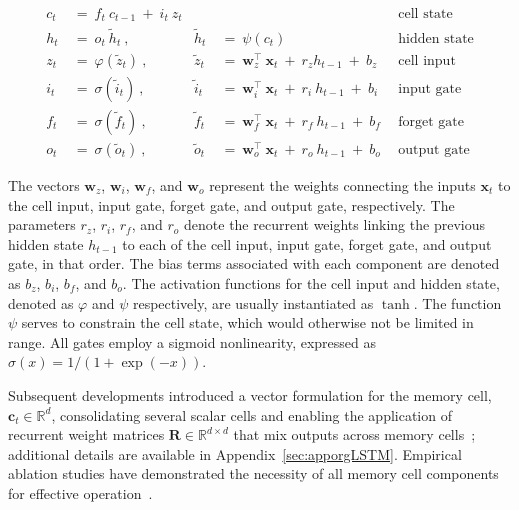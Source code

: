 \begin{align}
c_t \ &= \  f_t \ c_{t-1} \ + \ i_t \ z_t &  & &\text{cell state} \\
h_t  \ &= \ o_t \ \tilde{h}_t \ , & \tilde{h}_t \ &= \ \psi \left( c_t\right)
  &\text{hidden state} \\
z_t \ &= \ \varphi \left( \tilde{z}_t \right) \ , 
  &\tilde{z}_t \ &=  \ \mathbf{w}^\top_{z} \ \mathbf{x}_t \ + \
  r_{z}  h_{t-1} \ + \  b_{z} \ \
  &\text{cell input} \\
i_t \ &= \ \sigma \left( \tilde{i}_t  \right) \ , 
  &\tilde{i}_t \ &= \ \mathbf{w}^\top_{i} \ \mathbf{x}_t \ + \
  r_{i}  \ h_{t-1} \ + \  b_{i} \ \
  &\text{input gate} \\
f_t \ &= \ \sigma \left(  \tilde{f}_t \right) \ , 
  &\tilde{f}_t \ &= \ \mathbf{w}^\top_{f} \ \mathbf{x}_t  \ + \
  r_{f}  \ h_{t-1} \ + \  b_{f} \ \
  &\text{forget gate} \\
o_t \ &= \ \sigma \left( \tilde{o}_t \right) \ , 
  &\tilde{o}_t  \ &= \ \mathbf{w}^\top_{o} \ \mathbf{x}_t \ + \
  r_{o}  \ h_{t-1} \ + \  b_{o} \ \
  &\text{output gate} 
\end{align}

The vectors $\mathbf{w}_{z}$, $\mathbf{w}_{i}$, $\mathbf{w}_{f}$, and $\mathbf{w}_{o}$ represent the weights connecting the inputs $\mathbf{x}_t$ to the cell input, input gate, forget gate, and output gate, respectively. The parameters $r_{z}$, $r_{i}$, $r_{f}$, and $r_{o}$ denote the recurrent weights linking the previous hidden state $h_{t-1}$ to each of the cell input, input gate, forget gate, and output gate, in that order. The bias terms associated with each component are denoted as $b_{z}$, $b_{i}$, $b_{f}$, and $b_{o}$. The activation functions for the cell input and hidden state, denoted as $\varphi$ and $\psi$ respectively, are usually instantiated as $\tanh$. The function $\psi$ serves to constrain the cell state, which would otherwise not be limited in range. All gates employ a sigmoid nonlinearity, expressed as $\sigma \left( x \right)= 1/(1+\exp(-x))$. 

Subsequent developments introduced a vector formulation for the memory cell, $\mathbf{c}_t \in \mathbb{R}^{d}$, consolidating several scalar cells and enabling the application of recurrent weight matrices $\mathbf{R} \in \mathbb{R}^{d \times d}$ that mix outputs across memory cells~\citep{Greff:15}; additional details are available in Appendix~\ref{sec:apporgLSTM}. Empirical ablation studies have demonstrated the necessity of all memory cell components for effective operation~\citep{Greff:15}.

